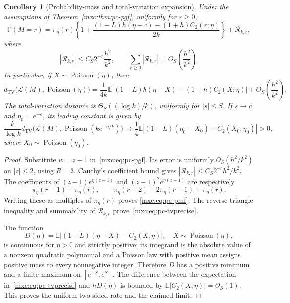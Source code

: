 \documentclass[11pt]{article}
\numberwithin{equation}{section}
\newtheorem{corollary}[theorem]{Corollary}
\theoremstyle{definition}
\theoremstyle{remark}
\begin{document}
\begin{corollary}[Probability-mass and total-variation expansion]
Under the assumptions of Theorem~\ref{mxc:thm:pc-pgf}, uniformly for
$r\geq0$,
\begin{equation}\label{mxc:eq:pc-pmf}
 \mathbb P(M=r)
 =\pi_\eta(r)\left\{
 1+\frac{(1-L)h(\eta-r)-(1+h)C_2(r;\eta)}{2k}
 \right\}+\mathcal R_{k,r},
\end{equation}
where
\[
 |\mathcal R_{k,r}|
 \leq C_S 2^{-r}\frac{h^2}{k^2},\qquad
 \sum_{r\geq0}|\mathcal R_{k,r}|
 =O_S\!\left(\frac{h^2}{k^2}\right).
\]
In particular, if $X\sim\operatorname{Poisson}(\eta)$, then
\begin{equation}\label{mxc:eq:pc-tvprecise}
 d_{\mathrm{TV}}\bigl(\mathcal L(M),\operatorname{Poisson}(\eta)\bigr)
 =\frac1{4k}\mathbb E\left|
 (1-L)h(\eta-X)-(1+h)C_2(X;\eta)
 \right|
 +O_S\!\left(\frac{h^2}{k^2}\right).
\end{equation}
The total-variation distance is $\Theta_S((\log k)/k)$, uniformly
for $|s|\leq S$.  If $s\to c$ and $\eta_0=e^{-c}$, its leading
constant is given by
\begin{equation}\label{mxc:eq:pc-tvlimit}
 \frac{k}{\log k}
 d_{\mathrm{TV}}\bigl(\mathcal L(M),\operatorname{Poisson}(k e^{-n/k})\bigr)
 \longrightarrow
 \frac14\mathbb E\left|
 (1-L)(\eta_0-X_0)-C_2(X_0;\eta_0)
 \right|>0,
\end{equation}
where $X_0\sim\operatorname{Poisson}(\eta_0)$.
\end{corollary}

\begin{proof}
Substitute $w=z-1$ in~\eqref{mxc:eq:pc-pgf}.  Its error is uniformly
$O_S(h^2/k^2)$ on $|z|\leq2$, using $R=3$.  Cauchy's coefficient
bound gives $|\mathcal R_{k,r}|\leq C_S2^{-r}h^2/k^2$.
The coefficients of $(z-1)e^{\eta(z-1)}$ and
$(z-1)^2e^{\eta(z-1)}$ are respectively
\[
 \pi_\eta(r-1)-\pi_\eta(r),\qquad
 \pi_\eta(r-2)-2\pi_\eta(r-1)+\pi_\eta(r).
\]
Writing these as multiples of $\pi_\eta(r)$ proves
\eqref{mxc:eq:pc-pmf}.  The reverse triangle inequality and summability
of $\mathcal R_{k,r}$ prove~\eqref{mxc:eq:pc-tvprecise}.

The function
\[
 D(\eta)=\mathbb E\left|
 (1-L)(\eta-X)-C_2(X;\eta)\right|,
 \quad X\sim\operatorname{Poisson}(\eta),
\]
is continuous for $\eta>0$ and strictly positive: its integrand
is the absolute value of a nonzero quadratic polynomial and a
Poisson law with positive mean assigns positive mass to every
nonnegative integer.  Therefore $D$ has a positive minimum and a
finite maximum on $[e^{-S},e^S]$.  The difference between the
expectation in~\eqref{mxc:eq:pc-tvprecise} and $hD(\eta)$ is bounded
by $\mathbb E|C_2(X;\eta)|=O_S(1)$.  This proves the uniform
two-sided rate and the claimed limit.
\end{proof}
\end{document}
